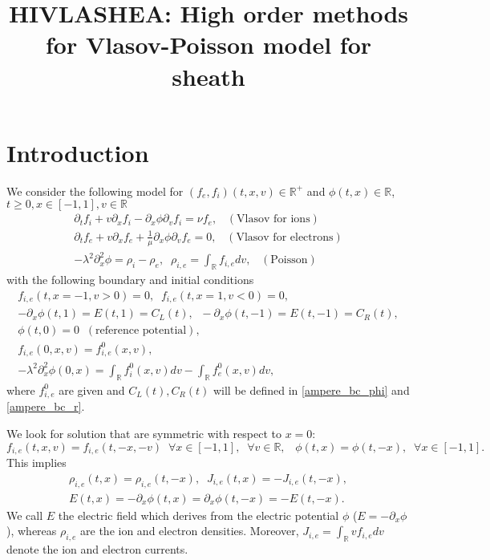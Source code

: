 \documentclass[12pt,english]{article}
\theoremstyle{plain}\newtheorem{theorem}{Theorem}[section]
\theoremstyle{plain}\newtheorem{corollary}{Corollary}[section]
\theoremstyle{plain}\newtheorem{lemma}{Lemma}[section]
\begin{document}
\title{HIVLASHEA: High order methods for Vlasov-Poisson model for sheath}
\date{}
\maketitle




\section{Introduction}

We consider the following model for $(f_e, f_i)(t, x, v)\in \mathbb{R}^+$ and $\phi(t, x)\in \mathbb{R}$, 
$t\geq 0, x\in [-1, 1], v\in \mathbb{R}$ 
\begin{equation}
\label{model}
  \begin{aligned}
   \partial_t f_i + v\partial_x f_i -\partial_x \phi \partial_v f_i = \nu f_e, \;\;\; (\mbox{Vlasov for ions})\\ 
   \partial_t f_e + v\partial_x f_e +\frac{1}{\mu}\partial_x \phi \partial_v f_e = 0, \;\;\; (\mbox{Vlasov for electrons})\\
   -\lambda^2\partial_x^2 \phi = \rho_i-\rho_e, \;\; \rho_{i,e}= \int_\mathbb{R} f_{i, e} dv,  \;\;\; (\mbox{Poisson})
  \end{aligned}
\end{equation}
with the following boundary and initial conditions 
\begin{equation}
\label{bc}
  \begin{aligned}
    f_{i, e}(t, x=-1, v>0)= 0, \;\; f_{i, e}(t, x=1, v<0) = 0, \\ 
    -\partial_x \phi(t, 1)=E(t, 1)=C_L(t), \;\; -\partial_x \phi(t, -1)=E(t, -1)=C_R(t), \\
     \phi(t, 0)=0 \;\;  (\mbox{reference potential}), \\ 
 f_{i, e}(0, x, v)=f_{i, e}^0(x, v),  \\ 
- \lambda^2\partial_x^2\phi(0, x) = \int_\mathbb{R} f_{i}^0(x, v) dv  - \int_\mathbb{R} f_{ e}^0(x, v) dv, 
  \end{aligned}
\end{equation}
where $f_{i, e}^0$ are given and $C_L(t), C_R(t)$ will be defined in \eqref{ampere_bc_phi} and \eqref{ampere_bc_r}. 


We look for solution that are symmetric with respect to $x=0$: 
$$
f_{i, e}(t, x, v) = f_{i, e}(t, -x, -v) \;\;  \forall x\in [-1, 1], \;\; \forall v\in\mathbb{R}, \;\;\; \phi(t, x) = \phi(t, -x), \;\;  \forall x\in [-1, 1].  
$$
This implies 
$$
 \begin{aligned}
\rho_{i, e}(t, x) = \rho_{i, e}(t, -x), \;\; J_{i,e}(t, x) = -J_{i,e}(t, -x), \\
E(t, x)=-\partial_x\phi(t, x) = \partial_x \phi(t, -x) = -E(t, -x). 
 \end{aligned}
$$
We call $E$ the electric field which derives from the electric potential $\phi$ ($E=-\partial_x \phi$), whereas $\rho_{i,e}$ are the ion and electron densities. 
Moreover, $J_{i,e} = \int_{\mathbb{R}} vf_{i,e} dv$ denote the ion and electron currents. 
\end{document}
